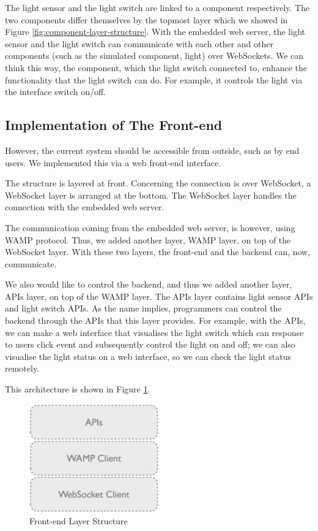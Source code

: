 The light sensor and the light switch are linked to a component respectively. The two components differ themselves by the topmost layer which we showed in Figure \ref{fig:component-layer-structure}. With the embedded web server, the light sensor and the light switch can communicate with each other and other components (such as the simulated component, light) over WebSockets. We can think this way, the component, which the light switch connected to, enhance the functionality that the light switch can do. For example, it controls the light via the interface switch on/off. 

\subsection{Implementation of The Front-end}
However, the current system should be accessible from outside, such as by end users. We implemented this via a web front-end interface. 

The structure is layered at front. Concerning the connection is over WebSocket, a WebSocket layer is arranged at the bottom. The WebSocket layer handles the connection with the embedded web server. 

The communication coming from the embedded web server, is however, using WAMP protocol. Thus, we added another layer, WAMP layer, on top of the WebSocket layer. With these two layers, the front-end and the backend can, now, communicate.

We also would like to control the backend, and thus we added another layer, APIs layer, on top of the WAMP layer. The APIs layer contains light sensor APIs and light switch APIs. As the name implies, programmers can control the backend through the APIs that this layer provides. For example, with the APIs, we can make a web interface that visualises the light switch which can response to users click event and subsequently control the light on and off; we can also visualise the light status on a web interface, so we can check the light status remotely. 

This architecture is shown in Figure \ref{fig:front-end-layer-structure}.

\begin{figure}[ht]
  \begin{center}
    \includegraphics[width=0.5\textwidth]{images/front-end-layer-structure.pdf}
    \caption{Front-end Layer Structure}
    \label{fig:front-end-layer-structure}
  \end{center}
\end{figure}

